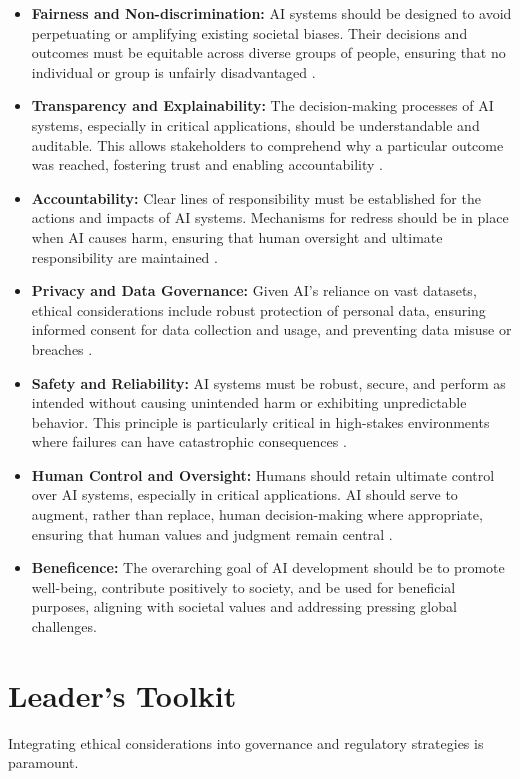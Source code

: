 \begin{itemize}
    \item \textbf{Fairness and Non-discrimination:} AI systems should be designed to avoid perpetuating or amplifying existing societal biases. Their decisions and outcomes must be equitable across diverse groups of people, ensuring that no individual or group is unfairly disadvantaged \parencite{Buolamwini2018GenderShades}.
    \item \textbf{Transparency and Explainability:} The decision-making processes of AI systems, especially in critical applications, should be understandable and auditable. This allows stakeholders to comprehend why a particular outcome was reached, fostering trust and enabling accountability \parencite{Adadi2018ExplainableAI}.
    \item \textbf{Accountability:} Clear lines of responsibility must be established for the actions and impacts of AI systems. Mechanisms for redress should be in place when AI causes harm, ensuring that human oversight and ultimate responsibility are maintained \parencite{NIST2023AIRMF}.
    \item \textbf{Privacy and Data Governance:} Given AI's reliance on vast datasets, ethical considerations include robust protection of personal data, ensuring informed consent for data collection and usage, and preventing data misuse or breaches \parencite{IBM2023DataGovernance}.
    \item \textbf{Safety and Reliability:} AI systems must be robust, secure, and perform as intended without causing unintended harm or exhibiting unpredictable behavior. This principle is particularly critical in high-stakes environments where failures can have catastrophic consequences \parencite{GoogleSAIF2023}.
    \item \textbf{Human Control and Oversight:} Humans should retain ultimate control over AI systems, especially in critical applications. AI should serve to augment, rather than replace, human decision-making where appropriate, ensuring that human values and judgment remain central \parencite{MaximAI2025}.
    \item \textbf{Beneficence:} The overarching goal of AI development should be to promote well-being, contribute positively to society, and be used for beneficial purposes, aligning with societal values and addressing pressing global challenges.
\end{itemize}

\section{Leader's Toolkit}
\label{sec:governance_leaders_toolkit}

Integrating ethical considerations into governance and regulatory strategies is paramount.
